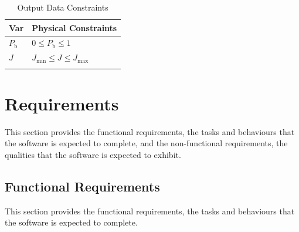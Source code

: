 \documentclass[12pt]{article}
\begin{document}
\begin{longtable}{l l}
\toprule
\textbf{Var} & \textbf{Physical Constraints}
\\
\midrule
\endhead
${P_{\text{b}}}$ & $0\leq{}{P_{\text{b}}}\leq{}1$
\\
$J$ & ${J_{\text{min}}}\leq{}J\leq{}{J_{\text{max}}}$
\\
\bottomrule
\caption{Output Data Constraints}
\label{Table:OutDataConstraints}
\end{longtable}
\section{Requirements}
\label{Sec:Requirements}
This section provides the functional requirements, the tasks and behaviours that the software is expected to complete, and the non-functional requirements, the qualities that the software is expected to exhibit.

\subsection{Functional Requirements}
\label{Sec:FRs}
This section provides the functional requirements, the tasks and behaviours that the software is expected to complete.
\end{document}

